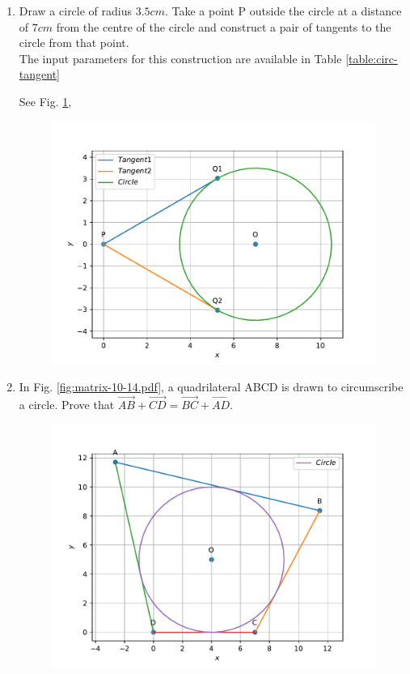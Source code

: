\documentclass[journal,12pt,twocolumn]{IEEEtran}
\begin{document}
\begin{enumerate}
    \item Draw a circle of radius $3.5 cm$. Take a point P outside the circle at a distance of $7 cm$ from the centre of the circle and construct a pair of tangents to the circle from that point. \\
	    \solution The input parameters for this construction are available in Table 
	\eqref{table:circ-tangent}
\begin{table}[ht!]
	
\caption{}
	\label{table:circ-tangent}
\end{table}
See Fig.
	  \ref{fig:matrix-10-13.pdf},
  \begin{figure}
	  \centering 
	  \includegraphics[width=\columnwidth]{figs/matrix-10-13.pdf}
	  \caption{}
	  \label{fig:matrix-10-13.pdf}
	  \end{figure}
    \item In Fig. 
	  \ref{fig:matrix-10-14.pdf},
a quadrilateral ABCD is drawn to circumscribe a circle. Prove that $\vec{AB} + \vec{CD} = \vec{BC} + \vec{AD}$.\\
  \begin{figure}
	  \centering 
	  \includegraphics[width=\columnwidth]{figs/matrix-10-14.pdf}

\end{figure}
\end{enumerate}
\end{document}
